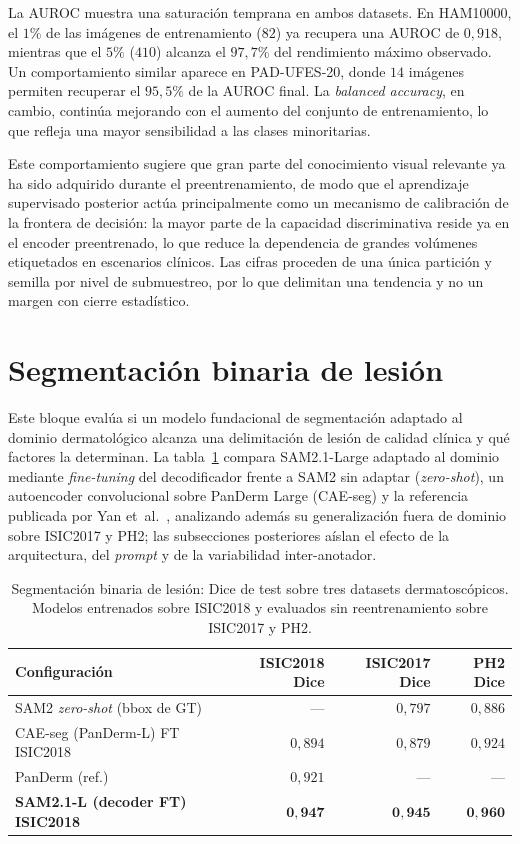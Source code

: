La AUROC muestra una saturación temprana en ambos datasets. En
HAM10000, el $1\%$ de las imágenes de entrenamiento ($82$) ya recupera
una AUROC de $0{,}918$, mientras que el $5\%$ ($410$) alcanza el
$97{,}7\%$ del rendimiento máximo observado. Un comportamiento similar
aparece en PAD-UFES-20, donde $14$ imágenes permiten recuperar el
$95{,}5\%$ de la AUROC final. La \emph{balanced accuracy}, en cambio,
continúa mejorando con el aumento del conjunto de entrenamiento, lo que
refleja una mayor sensibilidad a las clases minoritarias.

Este comportamiento sugiere que gran parte del conocimiento visual
relevante ya ha sido adquirido durante el preentrenamiento, de modo
que el aprendizaje supervisado posterior actúa principalmente como un
mecanismo de calibración de la frontera de decisión: la mayor parte de
la capacidad discriminativa reside ya en el encoder preentrenado, lo
que reduce la dependencia de grandes volúmenes etiquetados en
escenarios clínicos. Las cifras proceden de una única partición y
semilla por nivel de submuestreo, por lo que delimitan una tendencia y
no un margen con cierre estadístico.

\section{Segmentación binaria de lesión}
\label{sec:seg-results}

Este bloque evalúa si un modelo fundacional de segmentación adaptado
al dominio dermatológico alcanza una delimitación de lesión de calidad
clínica y qué factores la determinan. La tabla~\ref{tab:seg} compara
SAM2.1-Large adaptado al dominio mediante \emph{fine-tuning} del
decodificador frente a SAM2 sin adaptar (\emph{zero-shot}), un
autoencoder convolucional sobre PanDerm Large (CAE-seg) y la
referencia publicada por Yan et~al.~\cite{panderm2025}, analizando
además su generalización fuera de dominio sobre ISIC2017 y PH2; las
subsecciones posteriores aíslan el efecto de la arquitectura, del
\emph{prompt} y de la variabilidad inter-anotador.

\begin{table}[H]
\centering
\footnotesize
\setlength{\tabcolsep}{4pt}
\renewcommand{\arraystretch}{0.95}
\caption{Segmentación binaria de lesión: Dice de test sobre tres
datasets dermatoscópicos. Modelos entrenados sobre ISIC2018 y
evaluados sin reentrenamiento sobre ISIC2017 y PH2.}
\label{tab:seg}
\begin{tabular}{lrrr}
\hline
Configuración                         & ISIC2018 Dice & ISIC2017 Dice & PH2 Dice \\
\hline
SAM2 \emph{zero-shot} (bbox de GT)    & ---           & $0{,}797$     & $0{,}886$ \\
CAE-seg (PanDerm-L) FT ISIC2018       & $0{,}894$     & $0{,}879$     & $0{,}924$ \\
PanDerm \cite{panderm2025} (ref.)     & $0{,}921$     & ---           & --- \\
\textbf{SAM2.1-L (decoder FT) ISIC2018}  & $\mathbf{0{,}947}$ & $\mathbf{0{,}945}$ & $\mathbf{0{,}960}$ \\
\hline
\end{tabular}
\end{table}

